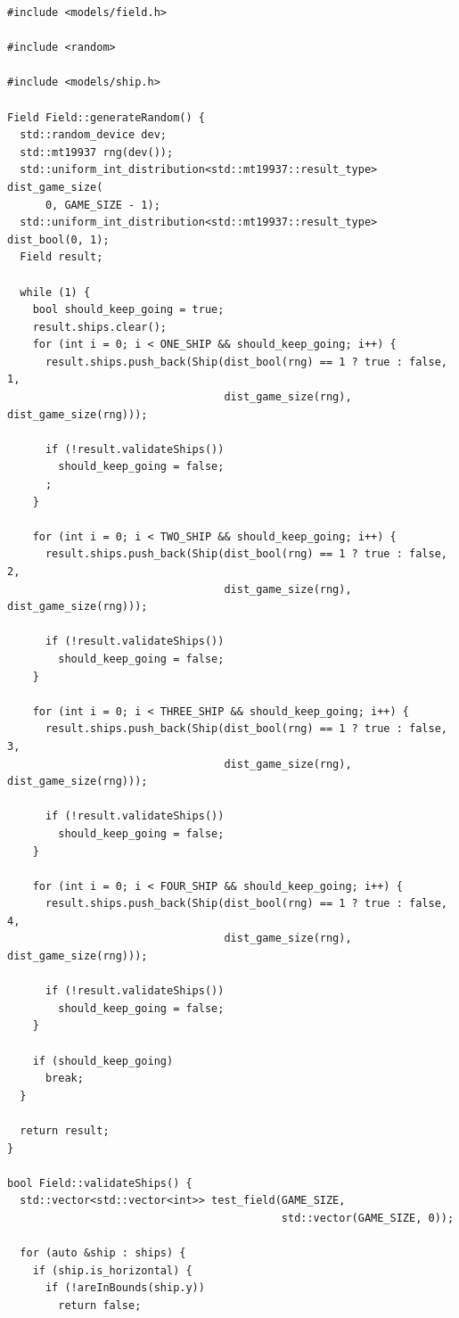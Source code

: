 \documentclass[a4paper,14pt]{extarticle}
\begin{document}
\begin{verbatim}
#include <models/field.h>

#include <random>

#include <models/ship.h>

Field Field::generateRandom() {
  std::random_device dev;
  std::mt19937 rng(dev());
  std::uniform_int_distribution<std::mt19937::result_type> dist_game_size(
      0, GAME_SIZE - 1);
  std::uniform_int_distribution<std::mt19937::result_type> dist_bool(0, 1);
  Field result;

  while (1) {
    bool should_keep_going = true;
    result.ships.clear();
    for (int i = 0; i < ONE_SHIP && should_keep_going; i++) {
      result.ships.push_back(Ship(dist_bool(rng) == 1 ? true : false, 1,
                                  dist_game_size(rng), dist_game_size(rng)));

      if (!result.validateShips())
        should_keep_going = false;
      ;
    }

    for (int i = 0; i < TWO_SHIP && should_keep_going; i++) {
      result.ships.push_back(Ship(dist_bool(rng) == 1 ? true : false, 2,
                                  dist_game_size(rng), dist_game_size(rng)));

      if (!result.validateShips())
        should_keep_going = false;
    }

    for (int i = 0; i < THREE_SHIP && should_keep_going; i++) {
      result.ships.push_back(Ship(dist_bool(rng) == 1 ? true : false, 3,
                                  dist_game_size(rng), dist_game_size(rng)));

      if (!result.validateShips())
        should_keep_going = false;
    }

    for (int i = 0; i < FOUR_SHIP && should_keep_going; i++) {
      result.ships.push_back(Ship(dist_bool(rng) == 1 ? true : false, 4,
                                  dist_game_size(rng), dist_game_size(rng)));

      if (!result.validateShips())
        should_keep_going = false;
    }

    if (should_keep_going)
      break;
  }

  return result;
}

bool Field::validateShips() {
  std::vector<std::vector<int>> test_field(GAME_SIZE,
                                           std::vector(GAME_SIZE, 0));

  for (auto &ship : ships) {
    if (ship.is_horizontal) {
      if (!areInBounds(ship.y))
        return false;


\end{verbatim}
\end{document}
